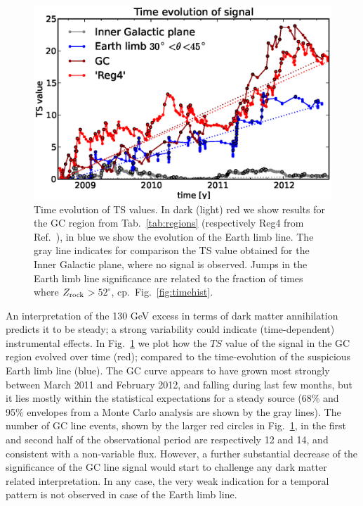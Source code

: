 \documentclass[aps,twocolumn,prd,superscriptaddress,showpacs,nofootinbib,fixfloat]{revtex4}
\newcommand{\zrock}{$Z_{\rm rock}$}
\begin{document}
\begin{figure}
  \begin{center}
    \includegraphics[width=1.0\linewidth]{plots/TS_time.eps}
  \end{center}
  \caption{Time evolution of TS values. In dark (light) red we show results
  for the GC region from Tab.~\ref{tab:regions} (respectively Reg4 from
  Ref.~\cite{Weniger:2012}), in blue we show the evolution of the Earth limb
  line. The gray line indicates for comparison the TS value obtained for the
  Inner Galactic plane, where no signal is observed.  Jumps in the Earth limb
  line significance are related to the fraction of times where
  \zrock$>52^\circ$, cp.~Fig.~\ref{fig:timehist}.}
  \label{fig:timeevolution}
\end{figure}

An interpretation of the 130 GeV excess in
terms of dark matter annihilation predicts it to be steady;
a strong variability could
indicate (time-dependent) instrumental effects. In
Fig.~\ref{fig:timeevolution} we plot how the $TS$ value of
the signal in the GC region evolved over time (red);
compared to the time-evolution of the suspicious Earth limb
line (blue). The GC curve appears to have grown most
strongly between March 2011 and February 2012, and falling
during last few months, but it lies mostly within the
statistical expectations for a steady source (68\% and 95\% envelopes from a
Monte Carlo analysis are shown by the gray lines). The number of
GC line events, shown by the larger red circles in
Fig.~\ref{fig:timeevolution}, in the first and second half
of the observational period are respectively 12 and 14, and
consistent with a non-variable flux. However, a further
substantial decrease of the significance of the GC line
signal would start to challenge any dark matter related
interpretation. In any case, the very weak indication for
a temporal pattern is not observed in case of the Earth limb
line. 
\end{document}
